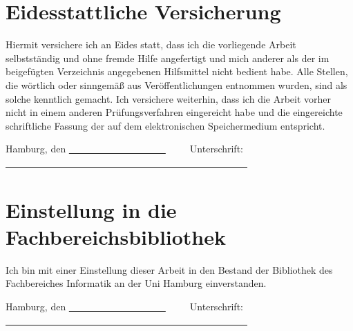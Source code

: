 
\chapter*{Eidesstattliche Versicherung}
\thispagestyle{empty}
Hiermit versichere ich an Eides statt, dass ich die vorliegende Arbeit selbstständig und ohne fremde Hilfe angefertigt und mich anderer als der im beigefügten Verzeichnis angegebenen Hilfsmittel nicht bedient habe.
Alle Stellen, die wörtlich oder sinngemäß aus Veröffentlichungen entnommen wurden, sind als solche kenntlich gemacht.
Ich versichere weiterhin, dass ich die Arbeit vorher nicht in einem anderen Prüfungsverfahren eingereicht habe und die eingereichte schriftliche Fassung der auf dem elektronischen Speichermedium entspricht.

\vspace{2cm}

\noindent Hamburg, den \uline{~~~~~~~~~~~~~~~~~~~~}~~~~~Unterschrift: \uline{~~~~~~~~~~~~~~~~~~~~~~~~~~~~~~~~~~~~~~~~~~~~~~~~~~}


\chapter*{Einstellung in die Fachbereichsbibliothek}
\thispagestyle{empty}
Ich bin mit einer Einstellung dieser Arbeit in den Bestand der Bibliothek des Fachbereiches Informatik an der Uni Hamburg einverstanden.

\vspace{2cm}

\noindent Hamburg, den \uline{~~~~~~~~~~~~~~~~~~~~}~~~~~Unterschrift: \uline{~~~~~~~~~~~~~~~~~~~~~~~~~~~~~~~~~~~~~~~~~~~~~~~~~~}
